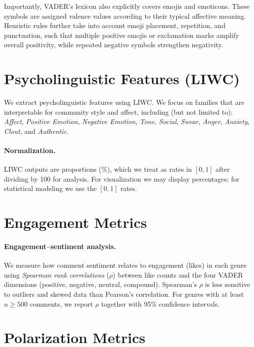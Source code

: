 Importantly, VADER’s lexicon also explicitly covers emojis and emoticons. 
These symbols are assigned valence values according to their typical affective meaning. 
Heuristic rules further take into account emoji placement, repetition, and punctuation, 
such that multiple positive emojis or exclamation marks amplify overall positivity, 
while repeated negative symbols strengthen negativity.

\section{Psycholinguistic Features (LIWC)}
\label{subsec:liwc}

We extract psycholinguistic features using LIWC. We focus on families that are
interpretable for community style and affect, including (but not limited to):
\textit{Affect}, \textit{Positive Emotion}, \textit{Negative Emotion},
\textit{Tone}, \textit{Social}, \textit{Swear}, \textit{Anger}, \textit{Anxiety},
\textit{Clout}, and \textit{Authentic}.

\paragraph{Normalization.} LIWC outputs are proportions (\%), which we treat as rates in $[0,1]$
after dividing by 100 for analysis. For visualization we may display percentages;
for statistical modeling we use the $[0,1]$ rates.

\section{Engagement Metrics}
\label{subsec:engagement}
\paragraph{Engagement–sentiment analysis.}

We measure how comment sentiment relates to engagement (likes) in each genre using
\emph{Spearman rank correlations} ($\rho$) between like counts and the four VADER
dimensions (positive, negative, neutral, compound). Spearman’s $\rho$ is less sensitive
to outliers and skewed data than Pearson’s correlation. For genres with at least
$n \geq 500$ comments, we report $\rho$ together with 95\% confidence intervals.

\section{Polarization Metrics}
\label{subsec:polarization}

